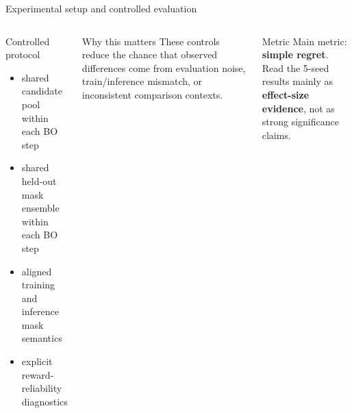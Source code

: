 \documentclass[aspectratio=169]{beamer}
\begin{document}
\begin{frame}{Experimental setup and controlled evaluation}
\begin{columns}[T,onlytextwidth]
\begin{minipage}[t][0.82\textheight]{\linewidth}\vspace{0pt}
  \begin{cardW}{Controlled protocol}
  \begin{itemize}
    \item shared candidate pool within each BO step
    \item shared held-out mask ensemble within each BO step
    \item aligned training and inference mask semantics
    \item explicit reward-reliability diagnostics
  \end{itemize}
  \end{cardW}

  \vfill

  \begin{cardG}{Why this matters}
  These controls reduce the chance that observed differences come from evaluation noise, train/inference mismatch, or inconsistent comparison contexts.
  \end{cardG}

  \vfill

  \begin{card}{Metric}
  Main metric: \textbf{simple regret}.\\[0.2em]
  Read the 5-seed results mainly as \textbf{effect-size evidence}, not as strong significance claims.
  \end{card}
\end{minipage}
\end{columns}
\end{frame}
\end{document}
